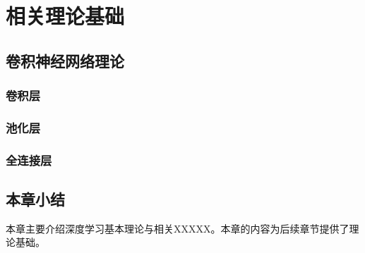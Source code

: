 \chapter{相关理论基础}



\section{卷积神经网络理论}

\subsection{卷积层}


\subsection{池化层}


\subsection{全连接层}



\section{本章小结}

本章主要介绍深度学习基本理论与相关XXXXX。本章的内容为后续章节提供了理论基础。

